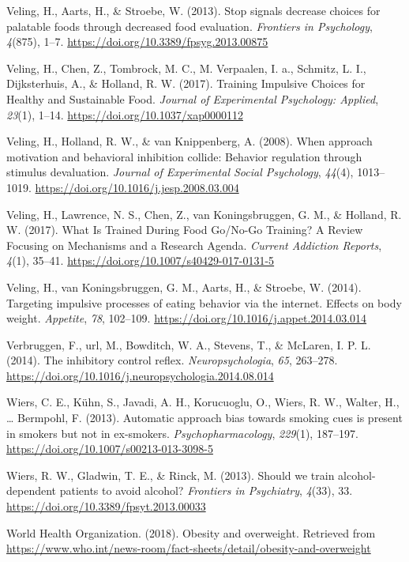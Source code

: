 \documentclass[man]{apa6}
\begin{document}
\leavevmode\hypertarget{ref-veling_stop_2013}{}%
Veling, H., Aarts, H., \& Stroebe, W. (2013). Stop signals decrease choices for palatable foods through decreased food evaluation. \emph{Frontiers in Psychology}, \emph{4}(875), 1--7. \url{https://doi.org/10.3389/fpsyg.2013.00875}

\leavevmode\hypertarget{ref-veling_training_2017}{}%
Veling, H., Chen, Z., Tombrock, M. C., M. Verpaalen, I. a., Schmitz, L. I., Dijksterhuis, A., \& Holland, R. W. (2017). Training Impulsive Choices for Healthy and Sustainable Food. \emph{Journal of Experimental Psychology: Applied}, \emph{23}(1), 1--14. \url{https://doi.org/10.1037/xap0000112}

\leavevmode\hypertarget{ref-veling_when_2008}{}%
Veling, H., Holland, R. W., \& van Knippenberg, A. (2008). When approach motivation and behavioral inhibition collide: Behavior regulation through stimulus devaluation. \emph{Journal of Experimental Social Psychology}, \emph{44}(4), 1013--1019. \url{https://doi.org/10.1016/j.jesp.2008.03.004}

\leavevmode\hypertarget{ref-veling_what_2017}{}%
Veling, H., Lawrence, N. S., Chen, Z., van Koningsbruggen, G. M., \& Holland, R. W. (2017). What Is Trained During Food Go/No-Go Training? A Review Focusing on Mechanisms and a Research Agenda. \emph{Current Addiction Reports}, \emph{4}(1), 35--41. \url{https://doi.org/10.1007/s40429-017-0131-5}

\leavevmode\hypertarget{ref-veling_targeting_2014}{}%
Veling, H., van Koningsbruggen, G. M., Aarts, H., \& Stroebe, W. (2014). Targeting impulsive processes of eating behavior via the internet. Effects on body weight. \emph{Appetite}, \emph{78}, 102--109. \url{https://doi.org/10.1016/j.appet.2014.03.014}

\leavevmode\hypertarget{ref-verbruggen_inhibitory_2014}{}%
Verbruggen, F., url, M., Bowditch, W. A., Stevens, T., \& McLaren, I. P. L. (2014). The inhibitory control reflex. \emph{Neuropsychologia}, \emph{65}, 263--278. \url{https://doi.org/10.1016/j.neuropsychologia.2014.08.014}

\leavevmode\hypertarget{ref-wiers_automatic_2013}{}%
Wiers, C. E., Kühn, S., Javadi, A. H., Korucuoglu, O., Wiers, R. W., Walter, H., \ldots{} Bermpohl, F. (2013). Automatic approach bias towards smoking cues is present in smokers but not in ex-smokers. \emph{Psychopharmacology}, \emph{229}(1), 187--197. \url{https://doi.org/10.1007/s00213-013-3098-5}

\leavevmode\hypertarget{ref-wiers_should_2013}{}%
Wiers, R. W., Gladwin, T. E., \& Rinck, M. (2013). Should we train alcohol-dependent patients to avoid alcohol? \emph{Frontiers in Psychiatry}, \emph{4}(33), 33. \url{https://doi.org/10.3389/fpsyt.2013.00033}

\leavevmode\hypertarget{ref-whoObesityOverweight2018}{}%
World Health Organization. (2018). Obesity and overweight. Retrieved from \url{https://www.who.int/news-room/fact-sheets/detail/obesity-and-overweight}

\endgroup
\end{document}

